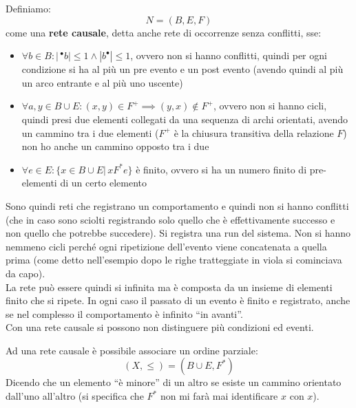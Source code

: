 \documentclass[a4paper,12pt, oneside]{book}
\begin{document}
\begin{definizione}
  Definiamo:
  \[N=(B,E,F)\]
  come una \textbf{rete causale}, detta anche rete di occorrenze senza conflitti,
  sse:
  \begin{itemize}
    \item $\forall b\in B:|\,^{\bullet}b|\leq 1\land |b^{\bullet}|\leq 1$, ovvero
    non si hanno conflitti, quindi per ogni condizione si ha al più un pre
    evento e un post evento (avendo quindi al più un arco entrante e al più uno
    uscente)
    
    \item $\forall a,y\in B\cup E:(x,y)\in F^+\implies (y,x)\not\in F^+$, ovvero
    non si hanno cicli, quindi presi due elementi collegati da una sequenza di
    archi orientati, avendo un cammino tra i due elementi ($F^+$ è la chiusura
    transitiva della relazione $F$) non ho anche un cammino opposto tra i due
    \item $\forall e\in E:\{x\in B\cup E|\,xF^*e\}$ è finito, ovvero si ha un
    numero finito di pre-elementi di un certo elemento
  \end{itemize}
  Sono quindi reti che registrano un comportamento e quindi non si hanno
  conflitti (che in caso sono sciolti registrando solo quello che è
  effettivamente successo e non quello che potrebbe succedere). Si registra una
  run del sistema. Non si hanno nemmeno cicli perché ogni ripetizione
  dell'evento viene concatenata a quella prima (come detto nell'esempio dopo le
  righe tratteggiate in viola si cominciava da capo).\\
  La rete può essere quindi si infinita ma è composta da un insieme di elementi
  finito che si ripete. In ogni caso il passato di un evento è finito e
  registrato, anche se nel complesso il comportamento è infinito ``in
  avanti''. \\
  Con una rete causale si possono non distinguere più condizioni ed eventi.

\end{definizione}
Ad una rete causale è possibile associare un ordine parziale:
\[(X,\leq)=(B\cup E, F^*)\]
Dicendo che un elemento ``è minore'' di un altro se esiste un cammino orientato
dall'uno all'altro (si specifica che $F^*$ non mi farà mai identificare $x$ con
$x$).
\end{document}
